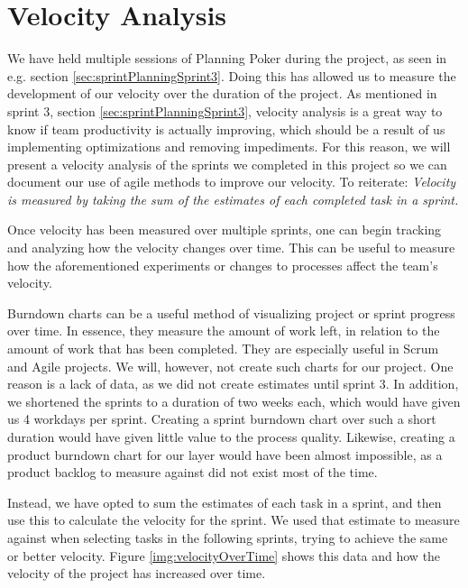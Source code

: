 \section{Velocity Analysis}\label{sec:velocityAnalysis}
We have held multiple sessions of Planning Poker during the project, as seen in e.g. section \ref{sec:sprintPlanningSprint3}.
Doing this has allowed us to measure the development of our velocity over the duration of the project. As mentioned in sprint 3, section \ref{sec:sprintPlanningSprint3}, velocity analysis is a great way to know if team productivity is actually improving, which should be a result of us implementing optimizations and removing impediments. For this reason, we will present a velocity analysis of the sprints we completed in this project so we can document our use of agile methods to improve our velocity.
To reiterate: \textit{Velocity is measured by taking the sum of the estimates of each completed task in a sprint\cite{sutherlandScrumArtDoing2014}.}

Once velocity has been measured over multiple sprints, one can begin tracking and analyzing how the velocity changes over time. This can be useful to measure how the aforementioned experiments or changes to processes affect the team's velocity.

Burndown charts can be a useful method of visualizing project or sprint progress over time. In essence, they measure the amount of work left, in relation to the amount of work that has been completed. They are especially useful in Scrum and Agile projects\cite{HowCreateBurndown2021}. We will, however, not create such charts for our project. One reason is a lack of data, as we did not create estimates until sprint 3.
In addition, we shortened the sprints to a duration of two weeks each, which would have given us 4 workdays per sprint. Creating a sprint burndown chart over such a short duration would have given little value to the process quality.
Likewise, creating a product burndown chart for our layer would have been almost impossible, as a product backlog to measure against did not exist most of the time.

Instead, we have opted to sum the estimates of each task in a sprint, and then use this to calculate the velocity for the sprint. We used that estimate to measure against when selecting tasks in the following sprints, trying to achieve the same or better velocity. Figure \ref{img:velocityOverTime} shows this data and how the velocity of the project has increased over time.

